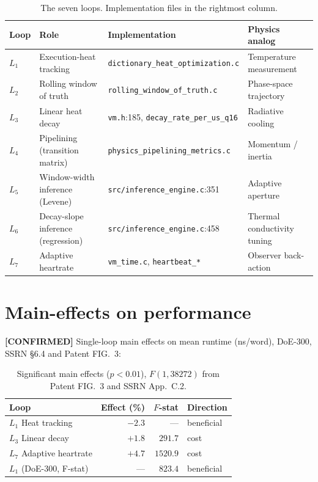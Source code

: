 \documentclass[11pt,letterpaper,openany]{book}
\theoremstyle{definition}
\theoremstyle{plain}
\newcommand{\confirmed}{\textcolor{green!50!black}{\textbf{[CONFIRMED]}}\xspace}
\newcommand{\Loop}[1]{L_{#1}}
\begin{document}
\begin{table}[H]
  \centering\small
  \begin{tabular}{l l l l}
    \toprule
    Loop & Role & Implementation & Physics analog \\
    \midrule
    $\Loop{1}$ & Execution-heat tracking         & \texttt{dictionary\_heat\_optimization.c} & Temperature measurement \\
    $\Loop{2}$ & Rolling window of truth         & \texttt{rolling\_window\_of\_truth.c}     & Phase-space trajectory \\
    $\Loop{3}$ & Linear heat decay               & \texttt{vm.h}:185, \texttt{decay\_rate\_per\_us\_q16} & Radiative cooling \\
    $\Loop{4}$ & Pipelining (transition matrix)  & \texttt{physics\_pipelining\_metrics.c}   & Momentum / inertia \\
    $\Loop{5}$ & Window-width inference (Levene) & \texttt{src/inference\_engine.c}:351      & Adaptive aperture \\
    $\Loop{6}$ & Decay-slope inference (regression) & \texttt{src/inference\_engine.c}:458   & Thermal conductivity tuning \\
    $\Loop{7}$ & Adaptive heartrate              & \texttt{vm\_time.c}, \texttt{heartbeat\_*} & Observer back-action \\
    \bottomrule
  \end{tabular}
  \caption{The seven loops. Implementation files in the rightmost column.}
\end{table}

\section{Main-effects on performance}

\confirmed Single-loop main effects on mean runtime (ns/word), DoE-300,
SSRN \S6.4 and Patent FIG.~3:
\begin{table}[H]
  \centering\small
  \begin{tabular}{l r r l}
    \toprule
    Loop & Effect (\%) & $F$-stat & Direction \\
    \midrule
    $\Loop{1}$ Heat tracking          & $-2.3$ & --- & beneficial \\
    $\Loop{3}$ Linear decay           & $+1.8$ & $291.7$ & cost \\
    $\Loop{7}$ Adaptive heartrate     & $+4.7$ & $1520.9$ & cost \\
    \midrule
    $\Loop{1}$ (DoE-300, F-stat)      & ---    & $823.4$ & beneficial \\
    \bottomrule
  \end{tabular}
  \caption{Significant main effects ($p<0.01$), $F(1, 38272)$ from
    Patent FIG.~3 and SSRN App.~C.2.}
\end{table}
\end{document}
